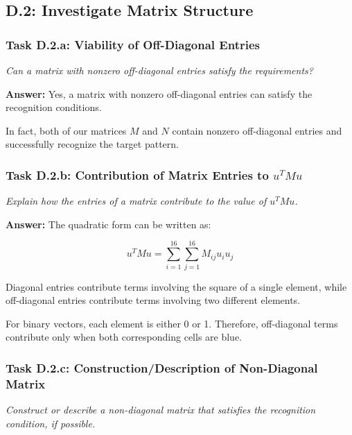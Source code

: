 \documentclass[11pt]{article}
\begin{document}
\vspace{1em}

\subsection*{D.2: Investigate Matrix Structure}

\subsubsection*{Task D.2.a: Viability of Off-Diagonal Entries}
\textit{Can a matrix with nonzero off-diagonal entries satisfy the requirements?}

\vspace{0.4em}
\textbf{Answer:} 
Yes, a matrix with nonzero off-diagonal entries
can satisfy the recognition conditions.

In fact, both of our matrices $M$ and $N$ contain
nonzero off-diagonal entries and successfully
recognize the target pattern.

\vspace{0.5em}

\subsubsection*{Task D.2.b: Contribution of Matrix Entries to $u^T M u$}
\textit{Explain how the entries of a matrix contribute to the value of $u^T M u$.}

\vspace{0.4em}
\textbf{Answer:} 
The quadratic form can be written as:

\[
u^TMu = \sum_{i=1}^{16}\sum_{j=1}^{16}
M_{ij}u_i u_j
\]

Diagonal entries contribute terms involving
the square of a single element, while
off-diagonal entries contribute terms involving
two different elements.

For binary vectors, each element is either
0 or 1. Therefore, off-diagonal terms contribute
only when both corresponding cells are blue.

\vspace{0.5em}

\subsubsection*{Task D.2.c: Construction/Description of Non-Diagonal Matrix}
\textit{Construct or describe a non-diagonal matrix that satisfies the recognition condition, if possible.}
\end{document}
